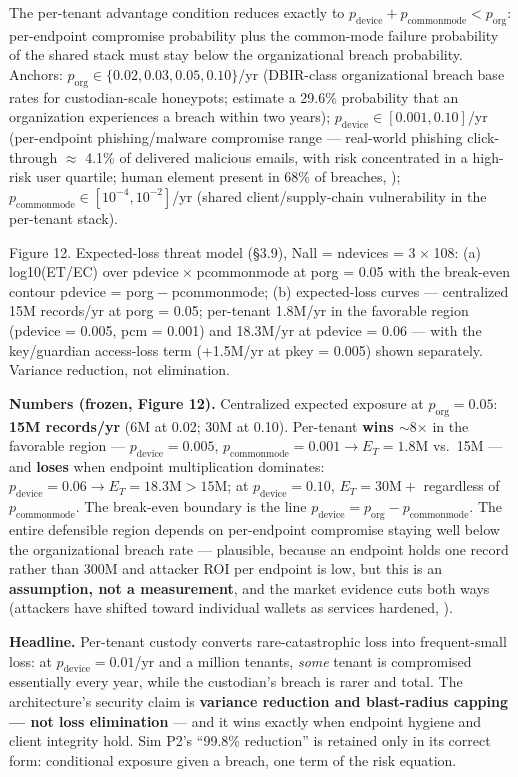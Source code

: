 \documentclass[
]{article}
\begin{document}
The per-tenant advantage condition reduces exactly to
\(p_{\mathrm{device}} + p_{\mathrm{commonmode}} < p_{\mathrm{org}}\):
per-endpoint compromise probability plus the common-mode failure
probability of the shared stack must stay below the organizational
breach probability. Anchors:
\(p_{\mathrm{org}} \in \{0.02, 0.03, 0.05, 0.10\}\)/yr (DBIR-class
organizational breach base rates for custodian-scale honeypots; estimate
a 29.6\% probability that an organization experiences a breach within
two years); \(p_{\mathrm{device}} \in [0.001, 0.10]\)/yr (per-endpoint
phishing/malware compromise range --- real-world phishing click-through
\(\approx\) 4.1\% of delivered malicious emails, with risk concentrated
in a high-risk user quartile; human element present in 68\% of breaches,
); \(p_{\mathrm{commonmode}} \in [10^{-4}, 10^{-2}]\)/yr (shared
client/supply-chain vulnerability in the per-tenant stack).

Figure 12. Expected-loss threat model (§3.9),
{Nall = ndevices = 3 × 108}: (a) {log10(ET/EC)} over
{pdevice × pcommonmode} at {porg = 0.05} with the break-even contour
{pdevice = porg − pcommonmode}; (b) expected-loss curves --- centralized
15M records/yr at {porg = 0.05}; per-tenant 1.8M/yr in the favorable
region ({pdevice = 0.005}, {pcm = 0.001}) and 18.3M/yr at
{pdevice = 0.06} --- with the key/guardian access-loss term ({+1.5}M/yr
at {pkey = 0.005}) shown separately. Variance reduction, not
elimination.

\textbf{Numbers (frozen, Figure 12).} Centralized expected exposure at
\(p_{\mathrm{org}} = 0.05\): \textbf{15M records/yr} (6M at 0.02; 30M at
0.10). Per-tenant \textbf{wins \(\sim 8\)\(\times\)} in the favorable
region --- \(p_{\mathrm{device}} = 0.005\),
\(p_{\mathrm{commonmode}} = 0.001 \to E_T = 1.8\)M vs.~15M --- and
\textbf{loses} when endpoint multiplication dominates:
\(p_{\mathrm{device}} = 0.06 \to E_T = 18.3\mathrm{M} > 15\mathrm{M}\);
at \(p_{\mathrm{device}} = 0.10\), \(E_T = 30\mathrm{M}{+}\) regardless
of \(p_{\mathrm{commonmode}}\). The break-even boundary is the line
\(p_{\mathrm{device}} = p_{\mathrm{org}} - p_{\mathrm{commonmode}}\).
The entire defensible region depends on per-endpoint compromise staying
well below the organizational breach rate --- plausible, because an
endpoint holds one record rather than 300M and attacker ROI per endpoint
is low, but this is an \textbf{assumption, not a measurement}, and the
market evidence cuts both ways (attackers have shifted toward individual
wallets as services hardened, ).

\textbf{Headline.} Per-tenant custody converts rare-catastrophic loss
into frequent-small loss: at \(p_{\mathrm{device}} = 0.01\)/yr and a
million tenants, \emph{some} tenant is compromised essentially every
year, while the custodian's breach is rarer and total. The
architecture's security claim is \textbf{variance reduction and
blast-radius capping --- not loss elimination} --- and it wins exactly
when endpoint hygiene and client integrity hold. Sim P2's ``99.8\%
reduction'' is retained only in its correct form: conditional exposure
given a breach, one term of the risk equation.
\end{document}
